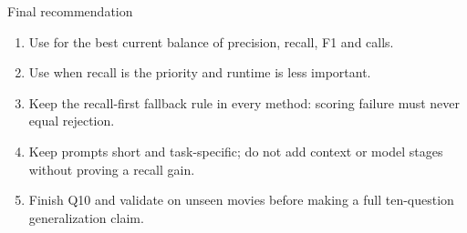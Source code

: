 \documentclass[aspectratio=169,10pt]{beamer}
\begin{document}
\begin{frame}{Final recommendation}
\begin{enumerate}
\item Use  for the best current balance of precision, recall, F1 and calls.
\item Use  when recall is the priority and runtime is less important.
\item Keep the recall-first fallback rule in every method: scoring failure must never equal rejection.
\item Keep prompts short and task-specific; do not add context or model stages without proving a recall gain.
\item Finish Q10 and validate on unseen movies before making a full ten-question generalization claim.
\end{enumerate}
\end{frame}
\end{document}
